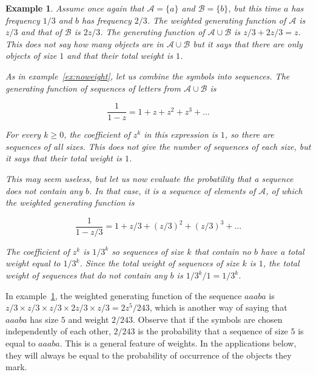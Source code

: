 \documentclass{article}
\newtheorem{example}{Example}
\begin{document}
\begin{example}
\label{ex:wweights}
Assume once again that $\mathcal{A} = \{a\}$ and $\mathcal{B} = \{b\}$,
but this time $a$ has frequency $1/3$ and $b$ has frequency $2/3$. The
weighted generating function of $\mathcal{A}$ is $z/3$ and that of
$\mathcal{B}$ is $2z/3$. The generating function of $\mathcal{A} \cup
\mathcal{B}$ is $z/3 + 2z/3 = z$. This does not say how many objects are
in $\mathcal{A} \cup \mathcal{B}$ but it says that there are only objects
of size $1$ and that their total weight is $1$.

As in example~\ref{ex:noweight}, let us combine the symbols into
sequences. The generating function of sequences of letters from
$\mathcal{A} \cup \mathcal{B}$ is

\begin{equation*}
\frac{1}{1-z} = 1 + z + z^2 + z^3 + \ldots
\end{equation*}

For every $k \geq 0$, the coefficient of $z^k$ in this expression is $1$,
so there are sequences of all sizes. This does not give the number of
sequences of each size, but it says that their total weight is $1$.

This may seem useless, but let us now evaluate the probatility that a
sequence does not contain any $b$. In that case, it is a sequence of
elements of $\mathcal{A}$, of which the weighted generating function is

\begin{equation*}
\frac{1}{1-z/3} = 1 + z/3 + (z/3)^2 + (z/3)^3 + \ldots
\end{equation*}

The coefficient of $z^k$ is $1/3^k$ so sequences of size $k$ that contain
no $b$ have a total weight equal to $1/3^k$. Since the total weight of
sequences of size $k$ is $1$, the total weight of sequences that do not
contain any $b$ is $1/3^k \big/ 1 = 1/3^k$.
\end{example}

In example~\ref{ex:wweights}, the weighted generating function of the
sequence $aaaba$ is $z/3 \times z/3 \times z/3 \times 2z/3 \times z/3 =
2z^5/243$, which is another way of saying that $aaaba$ has size $5$ and
weight $2/243$. Observe that if the symbols are chosen independently of
each other, $2/243$ is the probability that a sequence of size $5$ is
equal to $aaaba$. This is a general feature of weights. In the
applications below, they will always be equal to the probability
of occurrence of the objects they mark.
\end{document}
